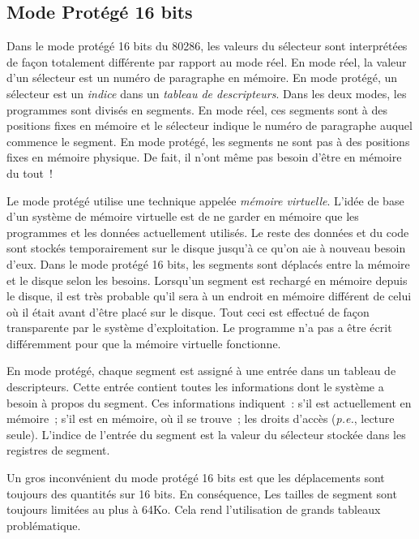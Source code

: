 \subsection{Mode Protégé 16 bits\label{16prot_mode}}

Dans le mode protégé 16 bits du 80286, les valeurs du sélecteur sont
interprétées de façon totalement différente par rapport au mode réel. En mode
réel, la valeur d'un sélecteur est un numéro de paragraphe en mémoire. En mode
protégé, un sélecteur est un \emph{indice} dans un \emph{tableau de descripteurs}.
Dans les deux modes, les programmes sont divisés en segments. En mode réel, ces
segments sont à des positions fixes en mémoire et le sélecteur indique le numéro
de paragraphe auquel commence le segment. En mode protégé, les segments ne sont
pas à des positions fixes en mémoire physique. De fait, il n'ont même
pas besoin d'être en mémoire du tout~!

Le mode protégé utilise une technique appelée \emph{mémoire virtuelle}.
L'idée de base d'un système de mémoire virtuelle est de ne garder en mémoire
que les programmes et les données actuellement utilisés. Le reste des données
et du code sont stockés temporairement sur le disque jusqu'à ce qu'on aie à
nouveau besoin d'eux. Dans le mode protégé 16 bits, les segments sont déplacés
entre la mémoire et le disque selon les besoins. Lorsqu'un segment est rechargé
en mémoire depuis le disque, il est très probable qu'il sera à un endroit en
mémoire différent de celui où il était avant d'être placé sur le disque. Tout
ceci est effectué de façon transparente par le système d'exploitation. Le programme
n'a pas a être écrit différemment pour que la mémoire virtuelle fonctionne.

En mode protégé, chaque segment est assigné à une entrée dans un tableau
de descripteurs. Cette entrée contient toutes les informations dont le système
a besoin à propos du segment. Ces informations indiquent~: s'il est actuellement
en mémoire~; s'il est en mémoire, où il se trouve~; les droits d'accès
({\em p.e.\/}, lecture seule). L'indice de l'entrée du segment est la valeur
du sélecteur stockée dans les registres de segment.

Un  gros inconvénient du mode protégé 16 bits
est que les déplacements sont toujours des quantités sur 16 bits. En conséquence,
Les tailles de segment sont toujours limitées au plus à 64Ko. Cela rend
l'utilisation de grands tableaux problématique.

